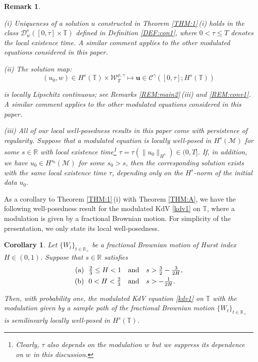 \documentclass[letterpaper, 11pt,  reqno]{amsart}
\newtheorem{remark}[theorem]{Remark}
\newtheorem{corollary}[theorem]{Corollary}
\newcommand{\1}{\hspace{0.5mm}\text{I}\hspace{0.5mm}}
\newcommand{\noi}{\noindent}
\newcommand{\R}{\mathbb{R}}
\newcommand{\T}{\mathbb{T}}
\newcommand{\g}{\gamma}
\newcommand{\M}{\mathcal{M}}
\newcommand{\cC}{\mathcal{C}}
\newcommand{\cD}{\mathscr{D}}
\newcommand{\W}{\mathcal{W}}
\newcommand{\uu}{\mathbf{u}}
\numberwithin{equation}{section}
\numberwithin{theorem}{section}
\begin{document}
\begin{remark}\label{REM:pers1}\rm

(i)
Uniqueness of a solution $u$ constructed in Theorem \ref{THM:1}\,(i)
holds 
 in the class $\cD_{w}^s([0, \tau] \times \T)$ 
 defined in Definition \ref{DEF:con1}, 
 where 
 $0 < \tau \le  T$ denotes the local existence time.
A similar comment applies to the other modulated equations
considered in this paper. 





\smallskip


\noi 
(ii)
The solution map:
 \[(u_0, w) \in H^s(\T) 
\times  \W^{\rho,\g}_T \longmapsto \uu \in \cC^\g([0, \tau]; H^s(\T))\]

\noi
is locally Lipschitz continuous;
see Remarks \ref{REM:main2}\,(iii) and \ref{REM:conv1}.
A similar comment applies to the other modulated equations
considered in this paper. 

\smallskip

\noi
(iii) All of our local well-posedness results
in this paper
come with {\it persistence of regularity}.
Suppose that  a modulated equation is locally well-posed
in $H^{s}(\M)$ for some $s \in \R$
with local existence time\footnote{Clearly, $\tau$ also depends
on the modulation $w$ but we suppress its dependence on $w$
in this discussion.}
 $\tau = \tau(\|u_0\|_{H^{s}}) \in (0, T]$.
If, in addition, we have $u_0 \in H^{s_0}(\M)$
for some $s_0 > s$, 
then the corresponding solution exists
with the same local existence time $\tau$, 
depending only on the $H^s$-norm of the initial data $u_0$.



\end{remark}



As a corollary to Theorem \ref{THM:1}\,(i)
with Theorem \ref{THM:A}, we have
the following well-posedness
result for the modulated KdV \eqref{kdv1} on $\T$, 
where a modulation is given by a fractional Brownian motion.
For simplicity of the presentation, 
we only state its local well-posedness.


\begin{corollary}\label{COR:1}
Let $\{W_t\}_{t\in \R_+}$ be a fractional Brownian motion 
of Hurst index $H\in(0,1)$.
Suppose that $s \in \R$ satisfies 
\begin{align*}
\textup{(a)} &\ \  \tfrac 23 \le H  <1 \quad \text{and} \quad 
s > \tfrac 32 - \tfrac{3}{2H} , \\
\textup{(b)} &\ \  0 < H < \tfrac 23\quad  \text{and} \quad  s > - \tfrac 1{2H}.
\end{align*}

\noi
Then, 
with probability one, 
the modulated KdV equation \eqref{kdv1}
on  $\T$
with the modulation given by 
a sample path of the
 fractional Brownian motion 
 $\{W_t\}_{t\in \R_+}$
is semilinearly locally well-posed in $H^s(\T)$.



\end{corollary}
\end{document}
